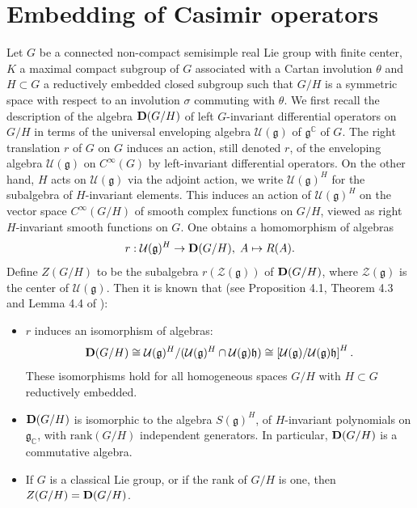 \documentclass[10]{amsart}
\theoremstyle{remark}
\theoremstyle{definition}
\numberwithin{equation}{section}
\newcommand{\rank}{\text{rank}}
\newcommand{\fg}{{\mathfrak g}}
\newcommand{\fh}{{\mathfrak h}}
\newcommand{\Cal}{\mathcal}
\newcommand{\beu}{\begin{equation*}}
\newcommand{\defn}{{:=}}
\begin{document}
{%
\section{Embedding of Casimir operators}\label{pbw}

Let $G$ be a connected non-compact semisimple real Lie group with finite center, $K$ a maximal compact subgroup of $G$ associated with a Cartan involution $\theta$ 
and $H\subset G$ a reductively embedded closed subgroup such that $G/H$ is a symmetric space with respect to an involution $\sigma$ commuting with $\theta$. 
We first recall the description of the algebra ${\bf D}(G/H)$ of left $G$-invariant differential operators on $G/H$ in terms of the universal enveloping algebra ${\Cal U}(\fg)$ of $\fg^{\mathbb C}$ of $G$. The right translation $r$ of $G$ on 
$G$
%
%
induces an action, still denoted $r$, of the enveloping algebra ${\Cal U}(\fg)$ on $C^\infty(G)$
%
%
by left-invariant differential operators. On the other hand, $H$ acts on ${\Cal U}(\fg)$ via the adjoint 
action, we write ${\Cal U}(\fg)^{H}$ for the subalgebra of $H$-invariant elements. This induces an action of ${\Cal U}(\fg)^{H}$ on the vector space $C^{\infty}(G/H)$ of smooth complex functions on $G/H$, viewed as right $H$-invariant smooth functions on $G$. One obtains a homomorphism of algebras
%
\begin{equation}\label{homo1}
r: {\Cal U}(\fg)^{H}\rightarrow {\bf D}(G/H),\;A\mapsto R(A).
\end{equation}
%
Define $Z(G/H)$ to be the subalgebra $r({\Cal Z}(\fg))$ of ${\bf D}(G/H)$, where ${\Cal Z}(\fg)$ is the center of ${\Cal U}(\fg)$. Then it is known that (see Proposition 4.1, Theorem 4.3 and Lemma 4.4 of \cite{HS94}):
%
\begin{itemize}
\item[(i)] $r$ induces an isomorphism of algebras: 
$${\bf D}(G/H)\cong{\mathcal U}(\fg)^{H}/({\Cal U}(\fg)^{H}\cap {\Cal U}(\fg)\fh)\cong\left [{\mathcal U}(\fg)/{\Cal U}(\fg)\fh\right ]^H. $$
These isomorphisms hold for
all homogeneous spaces $G/H$ with $H\subset G$ reductively embedded.
\item[(ii)] ${\bf D}(G/H)$ is isomorphic to the algebra $S(\mathfrak{g})^H$, of $H$-invariant polynomials on $\mathfrak{g}_{\mathbb C}$, with $\rank(G/H)$ independent generators. In particular, ${\bf D}(G/H)$ is a commutative algebra. 
\item[(iii)]  If $G$ is a classical Lie group, or if the rank of $G/H$ is one, then $Z(G/H)={\bf D}(G/H)$.
\end{itemize}
%

}
\end{document}
